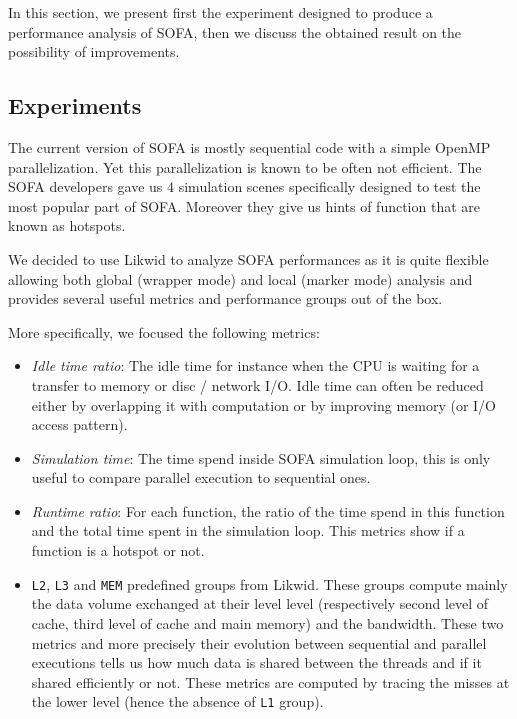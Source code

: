 In this section, we present first the experiment designed to produce a
performance analysis of \gls{SOFA}, then we discuss the obtained result on the
possibility of improvements.

\subsection{Experiments}

The current version of \gls{SOFA} is mostly sequential code with a simple
\gls{OpenMP} parallelization. Yet this parallelization is known to be often
not efficient. The \gls{SOFA} developers gave us $4$ simulation scenes
specifically designed to test the most popular part of \gls{SOFA}. Moreover
they give us hints of function that are known as hotspots.

We decided to use \gls{Likwid} to analyze \gls{SOFA} performances as it is
quite flexible allowing both global (wrapper mode) and local (marker mode)
analysis and provides several useful metrics and performance groups out of the
box.

More specifically, we focused the following metrics:
\begin{itemize}
    \item \emph{Idle time ratio}: The idle time for instance when the CPU is
        waiting for a transfer to memory or disc / network \gls{I/O}. Idle
        time can often be reduced either by overlapping it with computation or
        by improving memory (or \gls{I/O} access pattern).
    \item \emph{Simulation time}: The time spend inside \gls{SOFA} simulation loop,
        this is only useful to compare parallel execution to sequential ones.
    \item \emph{Runtime ratio}: For each function, the ratio of the time spend
        in this function and the total time spent in the simulation loop. This
        metrics show if a function is a hotspot or not.
    \item \texttt{L2}, \texttt{L3} and \texttt{MEM} predefined groups from
        \gls{Likwid}. These groups compute mainly the data volume exchanged at
        their level level (respectively second level of cache, third level of
        cache and main memory) and the bandwidth. These two metrics and more
        precisely their evolution between sequential and parallel executions
        tells us how much data is shared between the threads and if it shared
        efficiently or not. These metrics are computed by tracing the misses
        at the lower level (hence the absence of \texttt{L1} group).
\end{itemize}


